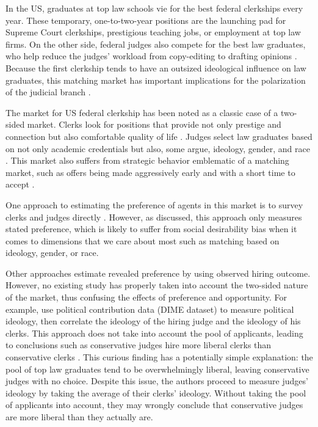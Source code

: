 In the US, graduates at top law schools vie for the best federal clerkships
every year. These temporary, one-to-two-year positions are the launching pad for
Supreme Court clerkships, prestigious teaching jobs, or employment at top law
firms. On the other side, federal judges also compete for the best law
graduates, who help reduce the judges' workload from copy-editing to drafting
opinions \citep{Gulati2016, Posner2001}. Because the first clerkship tends to
have an outsized ideological influence on law graduates, this matching market
has important implications for the polarization of the judicial branch
\citep{Ditslear2001, Liptak2007}.

The market for US federal clerkship has been noted as a classic case of a
two-sided market. Clerks look for positions that provide not only prestige and
connection but also comfortable quality of life \citep{Posner2001}. Judges
select law graduates based on not only academic credentials but also, some
argue, ideology, gender, and race \citep{Slotnick1984}. This market also suffers
from strategic behavior emblematic of a matching market, such as offers being
made aggressively early and with a short time to accept \citep{Posner2001,
  Posner2007}.

One approach to estimating the preference of agents in this market is to survey
clerks and judges directly \citep{Peppers2008}. However, as discussed, this
approach only measures stated preference, which is likely to suffer from social
desirability bias when it comes to dimensions that we care about most such as
matching based on ideology, gender, or race.

Other approaches estimate revealed preference by using observed hiring outcome.
However, no existing study has properly taken into account the two-sided nature
of the market, thus confusing the effects of preference and opportunity. For
example, \citet{Bonica2017} use political contribution data (DIME dataset) to
measure political ideology, then correlate the ideology of the hiring judge and
the ideology of his clerks. This approach does not take into account the pool of
applicants, leading to conclusions such as conservative judges hire more liberal
clerks than conservative clerks \citep[31]{Bonica2017}. This curious finding has
a potentially simple explanation: the pool of top law graduates tend to be
overwhelmingly liberal, leaving conservative judges with no choice. Despite
this issue, the authors proceed to measure judges' ideology by taking the
average of their clerks' ideology. Without taking the pool of applicants into
account, they may wrongly conclude that conservative judges are more liberal
than they actually are.

